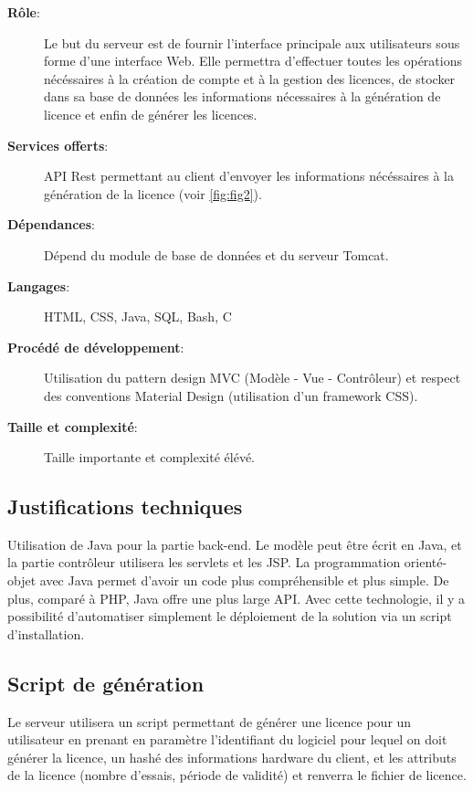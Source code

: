 \begin{description}
	\item[\textbf{Rôle}:]
	    Le but du serveur est de fournir l'interface principale aux utilisateurs sous forme d'une interface Web.
	    Elle permettra d'effectuer toutes les opérations nécéssaires à la création de compte et à la gestion des
	    licences, de stocker dans sa base de données les informations nécessaires à la génération de licence
        et enfin de générer les licences.
	\item[\textbf{Services offerts}:]
				API Rest \cite{REST} permettant au client d'envoyer les informations
				nécéssaires à la génération de la licence (voir \ref{fig:fig2}).			
	\item[\textbf{Dépendances}:]
				Dépend du module de base de données et du serveur Tomcat.
	\item[\textbf{Langages}:]
                HTML, CSS, Java, SQL, Bash, C
	\item[\textbf{Procédé de développement}:]
				Utilisation du pattern design MVC (Modèle - Vue - Contrôleur) et respect des
                conventions Material Design \cite{Material} (utilisation d'un framework CSS).
	\item[\textbf{Taille et complexité}:]
				Taille importante et complexité élévé.
\end{description}

\subsection*{Justifications techniques}
Utilisation de Java pour la partie back-end. Le modèle peut être écrit en Java, et la partie
contrôleur utilisera les servlets et les JSP. La programmation orienté-objet avec Java permet
d'avoir un code plus compréhensible et plus simple. De plus, comparé à PHP, Java offre une plus
large API. Avec cette technologie, il y a possibilité d'automatiser simplement le déploiement de
la solution via un script d'installation.

\subsection*{Script de génération}
Le serveur utilisera un script permettant de générer une licence pour un 
utilisateur en prenant en paramètre l'identifiant du logiciel pour lequel on doit 
générer la licence, un hashé des informations hardware du client, et les
attributs de la licence (nombre d'essais, période de validité) et renverra
le fichier de licence.

